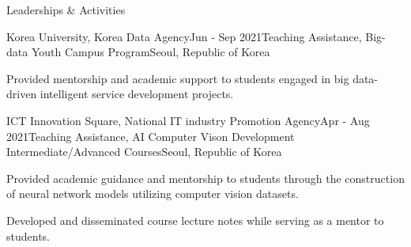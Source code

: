 \documentclass[
	a4paper, %
	11pt, %
]{resume} %
\begin{document}
\begin{rSection}{Leaderships \& Activities}

	\begin{rSubsection}{Korea University, Korea Data Agency}{Jun - Sep 2021}{Teaching Assistance, Big-data Youth Campus Program}{Seoul, Republic of Korea}
		\item {Provided mentorship and academic support to students engaged in big data-driven intelligent service development projects.}
	\end{rSubsection}
	

	\begin{rSubsection}{ICT Innovation Square, National IT industry Promotion Agency}{Apr - Aug 2021}{Teaching Assistance, AI Computer Vison Development Intermediate/Advanced Courses}{Seoul, Republic of Korea}
		\item {Provided academic guidance and mentorship to students through the construction of neural network models utilizing computer vision datasets.}
		\item {Developed and disseminated course lecture notes while serving as a mentor to students.}
	\end{rSubsection}

\end{rSection}





\end{document}

